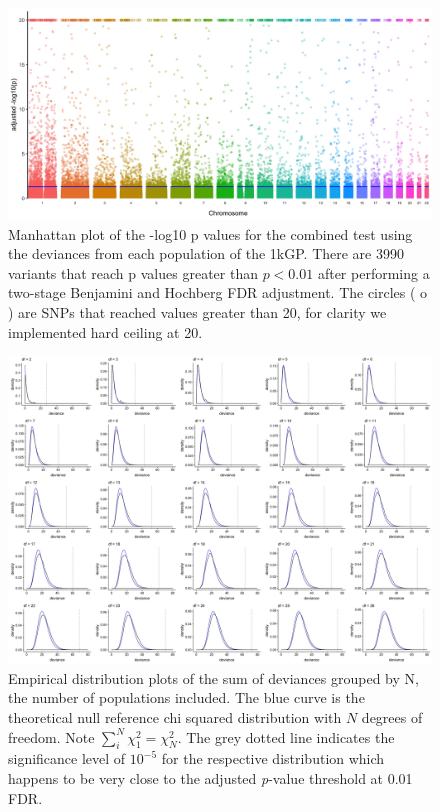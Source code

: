 \documentclass[9pt,lineno]{elife}
\begin{document}
\begin{figure}
\includegraphics[width=\hsize,keepaspectratio]{./Figures/ManhattanPlot_adjusted.jpg}

\caption{Manhattan plot of the -log10 p values for the combined test using the deviances from each population of the 1kGP. 
There are 3990 variants that reach p values greater than $ p < 0.01$ after performing a two-stage Benjamini and Hochberg FDR adjustment. 
The circles ( o ) are SNPs that reached values greater than 20, for clarity we implemented hard ceiling at 20.}
  \label{Manhattan}
\end{figure}


\begin{figure}
\includegraphics[width=\hsize,keepaspectratio]{./Figures/AllDeviances.jpg}

\caption{Empirical distribution plots of the sum of deviances grouped by N, the number of populations included. The blue curve is the theoretical null reference chi squared distribution with $N$ degrees of freedom. Note $\sum_i^N  \chi^2_1= \chi^2_N$. The grey dotted line indicates the significance level of $10^{-5}$ for the respective distribution which happens to be very close to the adjusted \textit{p}-value threshold at 0.01 FDR. }
\label{Deviances}
\end{figure}
\end{document}
